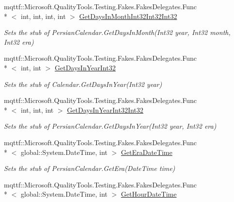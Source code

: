 \begin{DoxyCompactItemize}
mqttf\-::\-Microsoft.\-Quality\-Tools.\-Testing.\-Fakes.\-Fakes\-Delegates.\-Func\\*
$<$ int, int, int, int $>$ \hyperlink{class_system_1_1_globalization_1_1_fakes_1_1_stub_persian_calendar_ac973a886a099bb202226dcd302e5abe9}{Get\-Days\-In\-Month\-Int32\-Int32\-Int32}
\begin{DoxyCompactList}\small\item\em Sets the stub of Persian\-Calendar.\-Get\-Days\-In\-Month(\-Int32 year, Int32 month, Int32 era)\end{DoxyCompactList}\item 
mqttf\-::\-Microsoft.\-Quality\-Tools.\-Testing.\-Fakes.\-Fakes\-Delegates.\-Func\\*
$<$ int, int $>$ \hyperlink{class_system_1_1_globalization_1_1_fakes_1_1_stub_persian_calendar_a2c78bbb56daabe67521be4dee740fe6a}{Get\-Days\-In\-Year\-Int32}
\begin{DoxyCompactList}\small\item\em Sets the stub of Calendar.\-Get\-Days\-In\-Year(\-Int32 year)\end{DoxyCompactList}\item 
mqttf\-::\-Microsoft.\-Quality\-Tools.\-Testing.\-Fakes.\-Fakes\-Delegates.\-Func\\*
$<$ int, int, int $>$ \hyperlink{class_system_1_1_globalization_1_1_fakes_1_1_stub_persian_calendar_a27f28a7699256b2b4adbc326e901137f}{Get\-Days\-In\-Year\-Int32\-Int32}
\begin{DoxyCompactList}\small\item\em Sets the stub of Persian\-Calendar.\-Get\-Days\-In\-Year(\-Int32 year, Int32 era)\end{DoxyCompactList}\item 
mqttf\-::\-Microsoft.\-Quality\-Tools.\-Testing.\-Fakes.\-Fakes\-Delegates.\-Func\\*
$<$ global\-::\-System.\-Date\-Time, int $>$ \hyperlink{class_system_1_1_globalization_1_1_fakes_1_1_stub_persian_calendar_a21442353fdba64cfaf07592e607bf4c6}{Get\-Era\-Date\-Time}
\begin{DoxyCompactList}\small\item\em Sets the stub of Persian\-Calendar.\-Get\-Era(\-Date\-Time time)\end{DoxyCompactList}\item 
mqttf\-::\-Microsoft.\-Quality\-Tools.\-Testing.\-Fakes.\-Fakes\-Delegates.\-Func\\*
$<$ global\-::\-System.\-Date\-Time, int $>$ \hyperlink{class_system_1_1_globalization_1_1_fakes_1_1_stub_persian_calendar_a1f534b1fb8bf58653b20bcb5110eddc7}{Get\-Hour\-Date\-Time}

\end{DoxyCompactItemize}
